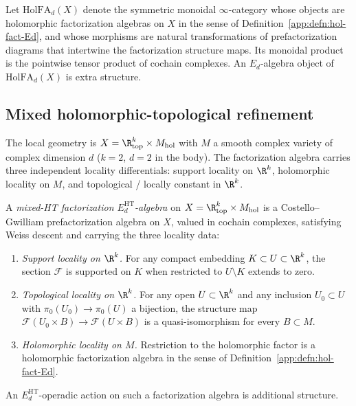 \begin{defn}\label{app:defn:HolFA-d-cat}
Let $\mathrm{HolFA}_d(X)$ denote the symmetric monoidal $\infty$-category
whose objects are holomorphic factorization algebras on $X$ in the
sense of Definition~\ref{app:defn:hol-fact-Ed}, and whose morphisms are
natural transformations of prefactorization diagrams that intertwine
the factorization structure maps.  Its monoidal product is the
pointwise tensor product of cochain complexes.  An \(E_d\)-algebra
object of \(\mathrm{HolFA}_d(X)\) is extra structure.
\end{defn}

\subsection{Mixed holomorphic-topological refinement}\label{app:hfc:mixed-HT}

The local geometry is
$X=\R^k_{\mathrm{top}}\times M_{\mathrm{hol}}$ with $M$ a smooth
complex variety of complex dimension $d$ ($k=2$, $d=2$ in the body).
The factorization algebra carries three independent locality
differentials: support locality on $\R^k$, holomorphic locality on
$M$, and topological / locally constant in $\R^k$.

\begin{defn}\label{app:defn:mixed-HT-fact}
A \emph{mixed-HT factorization $E_d^{\mathrm{HT}}$-algebra} on
$X=\R^k_{\mathrm{top}}\times M_{\mathrm{hol}}$ is a
Costello--Gwilliam prefactorization algebra on \(X\), valued in
cochain complexes, satisfying Weiss descent and carrying the three
locality data:
\begin{enumerate}[label=(\roman*)]
  \item \emph{Support locality on $\R^k$.}  For any compact embedding
    $K\subset U\subset\R^k$, the section $\mathcal F$ is supported on
    $K$ when restricted to $U\setminus K$ extends to zero.
  \item \emph{Topological locality on $\R^k$.}  For any open
    $U\subset\R^k$ and any inclusion $U_0\subset U$ with
    $\pi_0(U_0)\to\pi_0(U)$ a bijection, the structure map
    $\mathcal F(U_0\times B)\to\mathcal F(U\times B)$ is a
    quasi-isomorphism for every $B\subset M$.
  \item \emph{Holomorphic locality on $M$.}  Restriction to the
    holomorphic factor is a holomorphic factorization algebra
    in the sense of Definition~\ref{app:defn:hol-fact-Ed}.
\end{enumerate}
An \(E_d^{\mathrm{HT}}\)-operadic action on such a factorization
algebra is additional structure.
\end{defn}

